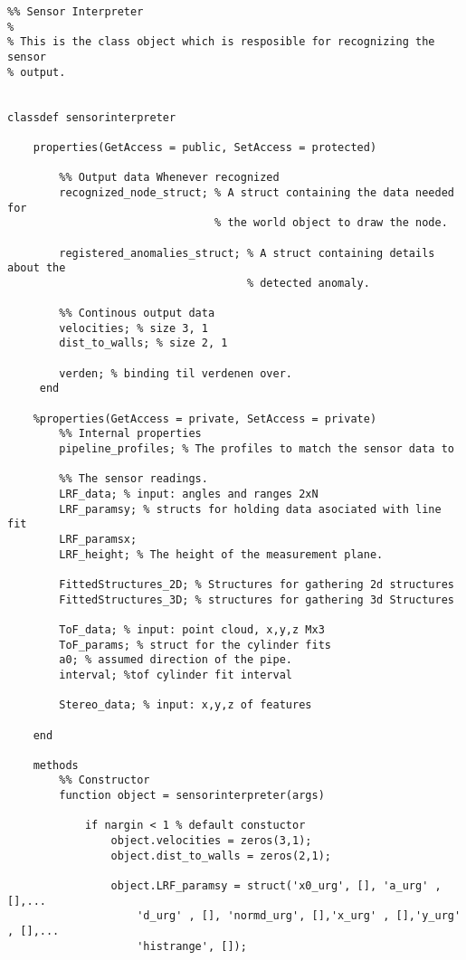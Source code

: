 \begin{lstlisting}
%% Sensor Interpreter
%
% This is the class object which is resposible for recognizing the sensor
% output. 
 
 
classdef sensorinterpreter 
   
    properties(GetAccess = public, SetAccess = protected)
        
        %% Output data Whenever recognized
        recognized_node_struct; % A struct containing the data needed for 
                                % the world object to draw the node.

        registered_anomalies_struct; % A struct containing details about the 
                                     % detected anomaly.
        
        %% Continous output data
        velocities; % size 3, 1 
        dist_to_walls; % size 2, 1 
        
        verden; % binding til verdenen over.
     end
    
    %properties(GetAccess = private, SetAccess = private)
        %% Internal properties
        pipeline_profiles; % The profiles to match the sensor data to
    
        %% The sensor readings.
        LRF_data; % input: angles and ranges 2xN
        LRF_paramsy; % structs for holding data asociated with line fit
        LRF_paramsx; 
        LRF_height; % The height of the measurement plane.
        
        FittedStructures_2D; % Structures for gathering 2d structures
        FittedStructures_3D; % structures for gathering 3d Structures
        
        ToF_data; % input: point cloud, x,y,z Mx3
        ToF_params; % struct for the cylinder fits
        a0; % assumed direction of the pipe. 
        interval; %tof cylinder fit interval
        
        Stereo_data; % input: x,y,z of features
    
    end
    
    methods
        %% Constructor
        function object = sensorinterpreter(args)
           
            if nargin < 1 % default constuctor
                object.velocities = zeros(3,1);
                object.dist_to_walls = zeros(2,1);
                
                object.LRF_paramsy = struct('x0_urg', [], 'a_urg' ,[],...
                    'd_urg' , [], 'normd_urg', [],'x_urg' , [],'y_urg' , [],...
                    'histrange', []);
                

\end{lstlisting}
